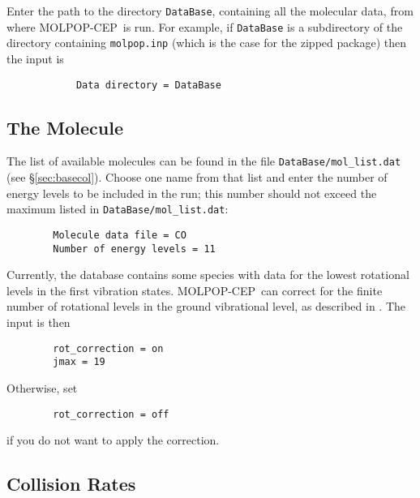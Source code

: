 \documentclass[12pt]{article}
\def\separation {0.5cm}
\def\M{MOLPOP-CEP}
\begin{document}
Enter the path to the directory {\tt DataBase}, containing all the molecular
data, from where \M\ is run. For example, if {\tt DataBase} is a subdirectory
of the directory containing \texttt{molpop.inp} (which is the case for the
zipped package) then the input is

\vspace{\separation}
\begin{verbatim}
            Data directory = DataBase
\end{verbatim}

\subsection{The Molecule}

The list of available molecules can be found in the file
\texttt{DataBase/mol\_list.dat} (see \S\ref{sec:basecol}). Choose one name
from that list and enter the number of energy levels to be included in the run;
this number should not exceed the maximum listed in
\texttt{DataBase/mol\_list.dat}:

\vspace{\separation}
\begin{verbatim}
        Molecule data file = CO     
        Number of energy levels = 11
\end{verbatim}

Currently, the database contains some species with data for the lowest 
rotational levels in the first vibration states. \M\ can correct
for the finite number of rotational levels in the ground vibrational level, as
described in \cite{lockett_elitzur92}.  The input is then

\vspace{\separation}
\begin{verbatim}
        rot_correction = on  
        jmax = 19  
\end{verbatim}
Otherwise, set 
\vspace{\separation}
\begin{verbatim}
        rot_correction = off
\end{verbatim}
if you do not want to apply the correction.

\subsection{Collision Rates}
\label{sec:collisions}
\end{document}
